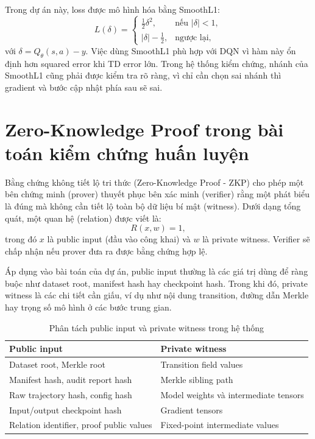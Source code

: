 \documentclass[12pt,a4paper,oneside]{report}
\begin{document}
Trong dự án này, loss được mô hình hóa bằng SmoothL1:
\[
L(\delta)=
\begin{cases}
\frac{1}{2}\delta^2, & \text{nếu } |\delta| < 1,\\
|\delta|-\frac{1}{2}, & \text{ngược lại},
\end{cases}
\]
với \(\delta = Q_\theta(s,a) - y\). Việc dùng SmoothL1 phù hợp với DQN vì hàm này ổn định hơn squared error khi TD error lớn. Trong hệ thống kiểm chứng, nhánh của SmoothL1 cũng phải được kiểm tra rõ ràng, vì chỉ cần chọn sai nhánh thì gradient và bước cập nhật phía sau sẽ sai.

\section{Zero-Knowledge Proof trong bài toán kiểm chứng huấn luyện}

Bằng chứng không tiết lộ tri thức (Zero-Knowledge Proof - ZKP) cho phép một bên chứng minh (prover) thuyết phục bên xác minh (verifier) rằng một phát biểu là đúng mà không cần tiết lộ toàn bộ dữ liệu bí mật (witness). Dưới dạng tổng quát, một quan hệ (relation) được viết là:
\[
R(x,w)=1,
\]
trong đó \(x\) là public input (đầu vào công khai) và \(w\) là private witness. Verifier sẽ chấp nhận nếu prover đưa ra được bằng chứng hợp lệ.

Áp dụng vào bài toán của dự án, public input thường là các giá trị dùng để ràng buộc như dataset root, manifest hash hay checkpoint hash. Trong khi đó, private witness là các chi tiết cần giấu, ví dụ như nội dung transition, đường dẫn Merkle hay trọng số mô hình ở các bước trung gian.

\begin{table}[H]
\centering
\caption{Phân tách public input và private witness trong hệ thống}
\begin{tabularx}{\textwidth}{p{} p{}}
\toprule
Public input & Private witness \\
\midrule
Dataset root, Merkle root & Transition field values \\
Manifest hash, audit report hash & Merkle sibling path \\
Raw trajectory hash, config hash & Model weights và intermediate tensors \\
Input/output checkpoint hash & Gradient tensors \\
Relation identifier, proof public values & Fixed-point intermediate values \\
\bottomrule
\end{tabularx}
\end{table}
\end{document}
